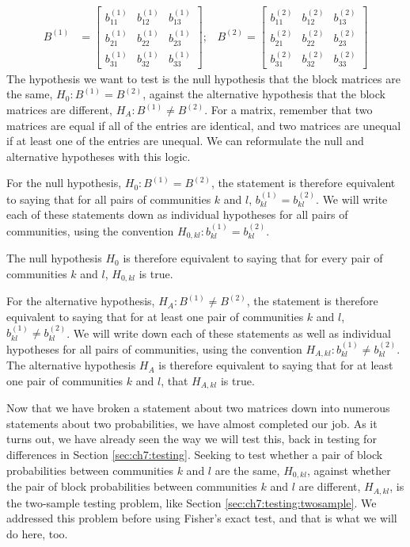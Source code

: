 \begin{align*}
    B^{(1)} &= \begin{bmatrix}
    b^{(1)}_{11} & b^{(1)}_{12} & b^{(1)}_{13} \\
    b^{(1)}_{21} & b^{(1)}_{22} & b^{(1)}_{23} \\
    b^{(1)}_{31} & b^{(1)}_{32} & b^{(1)}_{33}
    \end{bmatrix}; \;\;\; B^{(2)} = \begin{bmatrix}
    b^{(2)}_{11} & b^{(2)}_{12} & b^{(2)}_{13} \\
    b^{(2)}_{21} & b^{(2)}_{22} & b^{(2)}_{23} \\
    b^{(2)}_{31} & b^{(2)}_{32} & b^{(2)}_{33}
    \end{bmatrix}
\end{align*}
The hypothesis we want to test is the null hypothesis that the block matrices are the same, $H_0: B^{(1)} = B^{(2)}$, against the alternative hypothesis that the block matrices are different, $H_A: B^{(1)} \neq B^{(2)}$. For a matrix, remember that two matrices are equal if all of the entries are identical, and two matrices are unequal if at least one of the entries are unequal. We can reformulate the null and alternative hypotheses with this logic.

For the null hypothesis, $H_0: B^{(1)} = B^{(2)}$, the statement is therefore equivalent to saying that for all pairs of communities $k$ and $l$, $b^{(1)}_{kl} = b^{(2)}_{kl}$. We will write each of these statements down as individual hypotheses for all pairs of communities, using the convention $H_{0, kl}: b_{kl}^{(1)} = b^{(2)}_{kl}$. 

The null hypothesis $H_0$ is therefore equivalent to saying that for every pair of communities $k$ and $l$, $H_{0,kl}$ is true. 

For the alternative hypothesis, $H_A: B^{(1)} \neq B^{(2)}$, the statement is therefore equivalent to saying that for at least one pair of communities $k$ and $l$, $b^{(1)}_{kl} \neq b^{(2)}_{kl}$. We will write down each of these statements as well as individual hypotheses for all pairs of communities, using the convention $H_{A, kl} : b_{kl}^{(1)} \neq b^{(2)}_{kl}$. The alternative hypothesis $H_A$ is therefore equivalent to saying that for at least one pair of communities $k$ and $l$, that $H_{A,kl}$ is true.

Now that we have broken a statement about two matrices down into numerous statements about two probabilities, we have almost completed our job. As it turns out, we have already seen the way we will test this, back in testing for differences in Section \ref{sec:ch7:testing}. Seeking to test whether a pair of block probabilities between communities $k$ and $l$ are the same, $H_{0,kl}$, against whether the pair of block probabilities between communities $k$ and $l$ are different, $H_{A, kl}$, is the two-sample testing problem, like Section \ref{sec:ch7:testing:twosample}. We addressed this problem before using Fisher's exact test, and that is what we will do here, too.

